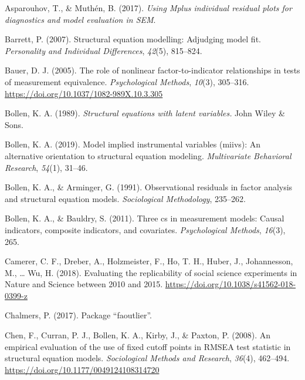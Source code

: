 \documentclass[
  english,
  doc]{apa6}
\newlength{\cslhangindent}
\newenvironment{cslreferences}%
  {\setlength{\parindent}{0pt}%
  \everypar{\setlength{\hangindent}{\cslhangindent}}\ignorespaces}%
  {\par}
\begin{document}
\hypertarget{refs}{}
\begin{cslreferences}
\leavevmode\hypertarget{ref-Asparouhov2017}{}%
Asparouhov, T., \& Muthén, B. (2017). \emph{Using Mplus individual residual plots for diagnostics and model evaluation in SEM}.

\leavevmode\hypertarget{ref-barrett2007structural}{}%
Barrett, P. (2007). Structural equation modelling: Adjudging model fit. \emph{Personality and Individual Differences}, \emph{42}(5), 815--824.

\leavevmode\hypertarget{ref-Bauer2005}{}%
Bauer, D. J. (2005). The role of nonlinear factor-to-indicator relationships in tests of measurement equivalence. \emph{Psychological Methods}, \emph{10}(3), 305--316. \url{https://doi.org/10.1037/1082-989X.10.3.305}

\leavevmode\hypertarget{ref-bollen_structural_1989}{}%
Bollen, K. A. (1989). \emph{Structural equations with latent variables.} John Wiley \& Sons.

\leavevmode\hypertarget{ref-bollen2019model}{}%
Bollen, K. A. (2019). Model implied instrumental variables (miivs): An alternative orientation to structural equation modeling. \emph{Multivariate Behavioral Research}, \emph{54}(1), 31--46.

\leavevmode\hypertarget{ref-bollen1991observational}{}%
Bollen, K. A., \& Arminger, G. (1991). Observational residuals in factor analysis and structural equation models. \emph{Sociological Methodology}, 235--262.

\leavevmode\hypertarget{ref-bollen2011three}{}%
Bollen, K. A., \& Bauldry, S. (2011). Three cs in measurement models: Causal indicators, composite indicators, and covariates. \emph{Psychological Methods}, \emph{16}(3), 265.

\leavevmode\hypertarget{ref-Camerer2018}{}%
Camerer, C. F., Dreber, A., Holzmeister, F., Ho, T. H., Huber, J., Johannesson, M., \ldots{} Wu, H. (2018). Evaluating the replicability of social science experiments in Nature and Science between 2010 and 2015. \url{https://doi.org/10.1038/s41562-018-0399-z}

\leavevmode\hypertarget{ref-chalmers2017package}{}%
Chalmers, P. (2017). Package ``faoutlier''.

\leavevmode\hypertarget{ref-Chen2008}{}%
Chen, F., Curran, P. J., Bollen, K. A., Kirby, J., \& Paxton, P. (2008). An empirical evaluation of the use of fixed cutoff points in RMSEA test statistic in structural equation models. \emph{Sociological Methods and Research}, \emph{36}(4), 462--494. \url{https://doi.org/10.1177/0049124108314720}


\end{cslreferences}
\end{document}
